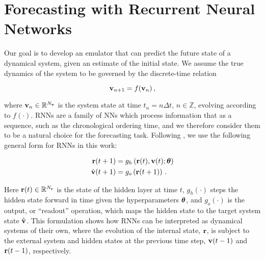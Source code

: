 \section{Forecasting with Recurrent Neural Networks}
\label{sec:rnn-architecture}

Our goal is to develop an emulator that can predict the future state of a
dynamical system, given an estimate of the initial state.
We assume the true dynamics of the system to be governed by the discrete-time
relation
\begin{linenomath*}\begin{equation}
    \mathbf{v}_{n+1} = f(\mathbf{v}_{n}) \, ,
\end{equation}\end{linenomath*}
where $\mathbf{v}_n \in\mathbb{R}^{N_{\mathbf{v}}}$ is the system state at time $t_n = n\Delta t$,
$n\in\mathbb{Z}$, evolving according to $f(\cdot)$.
RNNs are a family of NNs which process information that as a sequence,
such as the chronological ordering time,
and we therefore consider them to be a natural choice for the forecasting
task.
Following \citet{goodfellow_sequence_2016}, we use the following general form
for RNNs in this work: 
\begin{linenomath*}\begin{equation}
    \begin{aligned}
        \mathbf{r}(t+1) &= g_{h}\left(
            \mathbf{r}(t), \mathbf{v}(t); \bm{\theta}
            \right) \\
        \hat{\mathbf{v}}(t+1) &= g_{o} \left( \mathbf{r}(t+1) \right) \, .
    \end{aligned}
    \label{eq:rnn}
\end{equation}\end{linenomath*}
Here
$\mathbf{r}(t)\in\mathbb{R}^{N_{\mathbf{r}}}$ is the state of the hidden layer at time $t$,
$g_{h}(\cdot)$ steps the hidden state forward in time
given the hyperparameters $\bm{\theta}$,
and
$g_{o}(\cdot)$ is the output, or ``readout'' operation,
which maps the hidden state to the target system state $\hat{\mathbf{v}}$.
This formulation shows how RNNs can be interpreted as dynamical systems of their
own, where the evolution of the internal state, $\mathbf{r}$, is subject to the
external system and hidden states at the previous time step,
$\mathbf{v}(t-1)$ and $\mathbf{r}(t-1)$, respectively.

